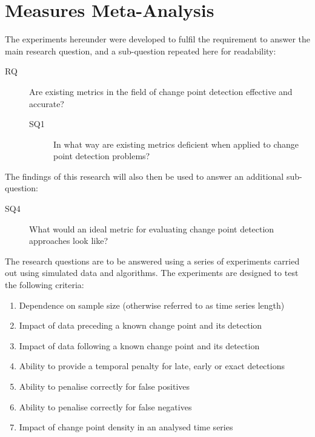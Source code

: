 \documentclass[../main.tex]{subfiles}
\begin{document}
\section{Measures Meta-Analysis}
\label{meta analysis explainer}

The experiments hereunder were developed to fulfil the requirement to answer the main research question, and a sub-question repeated here for readability:

\begin{description}
    \item[RQ] Are existing metrics in the field of change point detection effective and accurate?
    \begin{description}
    \item[SQ1] In what way are existing metrics deficient when applied to change point detection problems?
\end{description}
\end{description}

The findings of this research will also then be used to answer an additional sub-question:

\begin{description}
    \item[SQ4] What would an ideal metric for evaluating change point detection approaches look like?
\end{description}

The research questions are to be answered using a series of experiments carried out using simulated data and algorithms. The experiments are designed to test the following criteria:

\begin{enumerate}
    \item Dependence on sample size (otherwise referred to as time series length)
    \item Impact of data preceding a known change point and its detection
    \item Impact of data following a known change point and its detection
    \item Ability to provide a temporal penalty for late, early or exact detections
    \item Ability to penalise correctly for false positives
    \item Ability to penalise correctly for false negatives
    \item Impact of change point density in an analysed time series
\end{enumerate}
\end{document}
